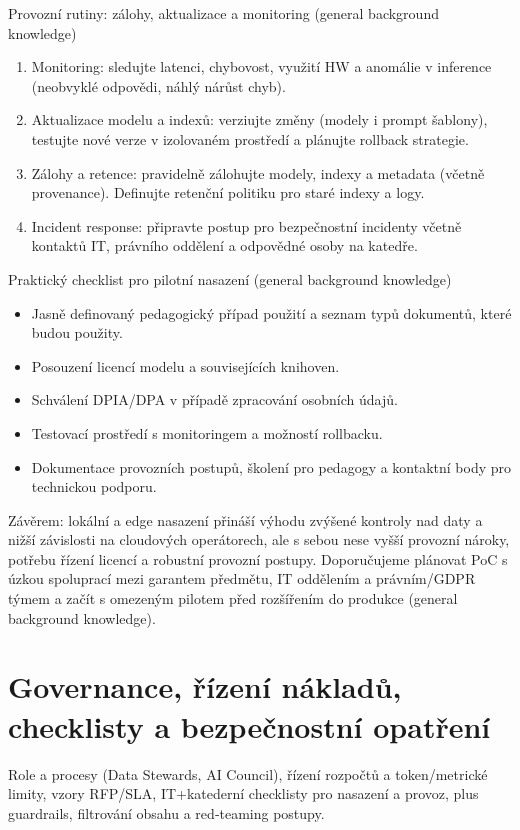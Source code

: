 \documentclass{report}%
\begin{document}
Provozní rutiny: zálohy, aktualizace a monitoring (general background knowledge)
\begin{enumerate}
  \item Monitoring: sledujte latenci, chybovost, využití HW a anomálie v inference (neobvyklé odpovědi, náhlý nárůst chyb).
  \item Aktualizace modelu a indexů: verziujte změny (modely i prompt šablony), testujte nové verze v izolovaném prostředí a plánujte rollback strategie.
  \item Zálohy a retence: pravidelně zálohujte modely, indexy a metadata (včetně provenance). Definujte retenční politiku pro staré indexy a logy.
  \item Incident response: připravte postup pro bezpečnostní incidenty včetně kontaktů IT, právního oddělení a odpovědné osoby na katedře.
\end{enumerate}

Praktický checklist pro pilotní nasazení (general background knowledge)
\begin{itemize}
  \item Jasně definovaný pedagogický případ použití a seznam typů dokumentů, které budou použity.
  \item Posouzení licencí modelu a souvisejících knihoven.
  \item Schválení DPIA/DPA v případě zpracování osobních údajů.
  \item Testovací prostředí s monitoringem a možností rollbacku.
  \item Dokumentace provozních postupů, školení pro pedagogy a kontaktní body pro technickou podporu.
\end{itemize}

Závěrem: lokální a edge nasazení přináší výhodu zvýšené kontroly nad daty a nižší závislosti na cloudových operátorech, ale s sebou nese vyšší provozní nároky, potřebu řízení licencí a robustní provozní postupy. Doporučujeme plánovat PoC s úzkou spoluprací mezi garantem předmětu, IT oddělením a právním/GDPR týmem a začít s omezeným pilotem před rozšířením do produkce (general background knowledge).%

%
\section{Governance, řízení nákladů, checklisty a bezpečnostní opatření}%
Role a procesy (Data Stewards, AI Council), řízení rozpočtů a token/metrické limity, vzory RFP/SLA, IT+katederní checklisty pro nasazení a provoz, plus guardrails, filtrování obsahu a red‑teaming postupy.%
\end{document}
